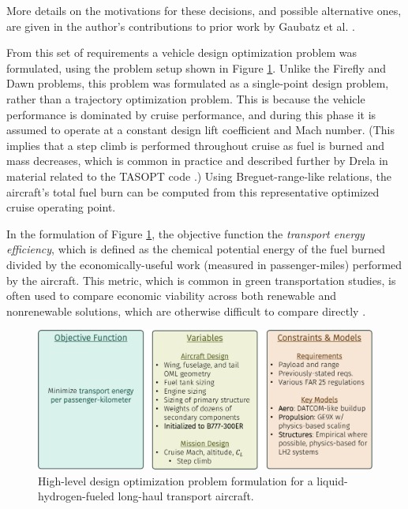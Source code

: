 More details on the motivations for these decisions, and possible alternative ones, are given in the author's contributions to prior work by Gaubatz et al. \cite{gaubatz_estimating_2023}.

From this set of requirements a vehicle design optimization problem was formulated, using the problem setup shown in Figure \ref{fig:h2_formulation}. Unlike the Firefly and Dawn problems, this problem was formulated as a single-point design problem, rather than a trajectory optimization problem. This is because the vehicle performance is dominated by cruise performance, and during this phase it is assumed to operate at a constant design lift coefficient and Mach number. (This implies that a step climb is performed throughout cruise as fuel is burned and mass decreases, which is common in practice and described further by Drela in material related to the TASOPT code \cite{drela_tasopt_2010}.) Using Breguet-range-like relations, the aircraft's total fuel burn can be computed from this representative optimized cruise operating point.

In the formulation of Figure \ref{fig:h2_formulation}, the objective function the \emph{transport energy efficiency}, which is defined as the chemical potential energy of the fuel burned divided by the economically-useful work (measured in passenger-miles) performed by the aircraft. This metric, which is common in green transportation studies, is often used to compare economic viability across both renewable and nonrenewable solutions, which are otherwise difficult to compare directly \cite{waypoint2050}.

\begin{figure}[H]
    \centering
    \includegraphics[width=\textwidth,page=1]{../figures/Hydrogen_figures-crop.pdf}
    \caption{High-level design optimization problem formulation for a liquid-hydrogen-fueled long-haul transport aircraft.}
    \label{fig:h2_formulation}
\end{figure}

